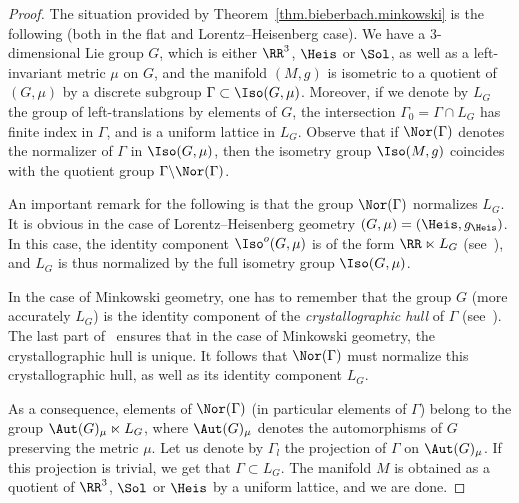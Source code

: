 \begin{proof}
The situation provided by Theorem~\ref{thm.bieberbach.minkowski} is the following (both in the flat and Lorentz--Heisenberg case). We have a $3$-dimensional Lie group $G$, which is either $\RR^3$, $\Heis$ or $\Sol$, as well as a left-invariant metric $\mu$ on $G$, and the manifold $(M,g)$ is isometric to a quotient of $(G,\mu)$ by a discrete subgroup $\Gamma \subset \Iso(G,\mu)$. Moreover, if we denote by $L_G$ the group of left-translations by elements of $G$, the intersection $\Gamma_0=\Gamma \cap L_G$ has finite index in $\Gamma$, and is a uniform lattice in $L_G$. Observe that if $\Nor(\Gamma)$ denotes the normalizer of $\Gamma$ in $\Iso(G,\mu)$, then the isometry group $\Iso(M,g)$ coincides with the quotient group $\Gamma \backslash \Nor(\Gamma)$.

An important remark for the following is that the group $\Nor(\Gamma)$ normalizes $L_G$. It is obvious in the case of Lorentz--Heisenberg geometry $(G,\mu)=(\Heis,g_{\Heis})$. In this case, the identity component $\Iso^o(G,\mu)$ is of the form $\RR \ltimes L_G$ (see~\cite[Section~4.1]{sorin.ghani}), and $L_G$ is thus normalized by the full isometry group $\Iso(G,\mu)$.

In the case of Minkowski geometry, one has to remember that the group $G$ (more accurately $L_G$) is the identity component of the \emph{crystallographic hull} of $\Gamma$ (see~\cite[Section~1.4]{fried.goldman}). The last part of~\cite[Theorem~1.4]{fried.goldman} ensures that in the case of Minkowski geometry, the crystallographic hull is unique. It follows that $\Nor(\Gamma)$ must normalize this crystallographic hull, as well as its identity component $L_G$.

As a consequence, elements of $\Nor(\Gamma)$ (in particular elements of $\Gamma$) belong to the group $\Aut(G)_{\mu} \ltimes L_G$, where $\Aut(G)_{\mu}$ denotes the automorphisms of $G$ preserving the metric $\mu$. Let us denote by $\Gamma_l$ the projection of $\Gamma$ on $\Aut(G)_{\mu}$. If this projection is trivial, we get that $\Gamma \subset L_G$. The manifold $M$ is obtained as a quotient of $\RR^3$, $ \Sol$ or $ \Heis$ by a uniform lattice, and we are done.



\end{proof}
